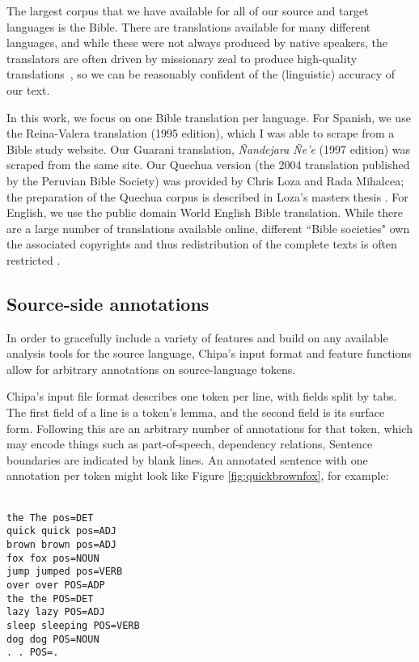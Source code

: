 The largest corpus that we have available for all of our source and target
languages is the Bible. There are translations available for many different
languages, and while these were not always produced by native speakers, the
translators are often driven by missionary zeal to produce high-quality
translations~\cite{DBLP:journals/lre/ResnikOD99}, so we can be reasonably
confident of the (linguistic) accuracy of our text.

In this work, we focus on one Bible translation per language. For Spanish, we
use the Reina-Valera translation (1995 edition), which I was able to scrape
from a Bible study website. Our Guarani translation, \emph{Ñandejara Ñe'e}
(1997 edition) was scraped from the same site. Our Quechua version (the 2004
translation published by the Peruvian Bible Society) was provided by Chris Loza
and Rada Mihalcea; the preparation of the Quechua corpus is described in Loza's
masters thesis \cite{chrisloza}. For English, we use the public domain World
English Bible translation.
While there are a large number of translations available online, different
``Bible societies" own the associated copyrights and thus redistribution of the
complete texts is often restricted \cite{MAYER14.220.L14-1215}.

\subsection{Source-side annotations}
\label{sec:annotations}
In order to gracefully include a variety of features and build on
any available analysis tools for the source language, Chipa's input format and
feature functions allow for arbitrary annotations on source-language tokens.

Chipa's input file format describes one token per line, with fields split by
tabs.  The first field of a line is a token's lemma, and the second field is
its surface form.  Following this are an arbitrary number of annotations for
that token, which may encode things such as part-of-speech, dependency
relations, Sentence boundaries are indicated by blank lines. An annotated
sentence with one annotation per token might look like Figure
\ref{fig:quickbrownfox}, for example:

\begin{figure*}
\raggedright \texttt{\\
the	The	pos=DET \\
quick	quick	pos=ADJ \\
brown	brown	pos=ADJ \\
fox	fox	pos=NOUN \\
jump	jumped	pos=VERB \\
over	over	POS=ADP \\
the	the	POS=DET \\
lazy	lazy	POS=ADJ \\
sleep sleeping	POS=VERB \\
dog	dog	POS=NOUN \\
.	.	POS=. \\
  }
  \caption{Example annotated sentence.}
  \label{fig:quickbrownfox}
\end{figure*}

